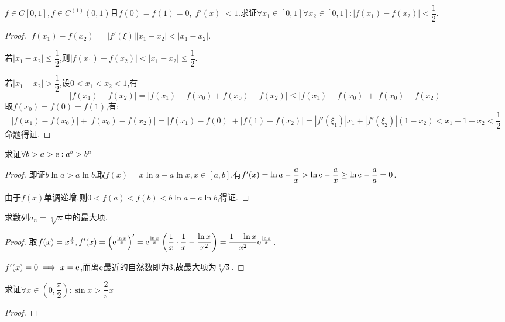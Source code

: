 \documentclass[UTF8]{book}
\begin{document}
    \begin{example}
        $f\in C[0,1],f\in C^{(1)}(0,1)$且$f(0)=f(1)=0, |f'(x)|<1$.求证$\forall x_1\in [0,1]\forall x_2\in [0,1]:|f(x_1)-f(x_2)|<\dfrac{1}{2}$.
    \end{example}\begin{proof}
        $|f(x_1)-f(x_2)|=|f'(\xi)||x_1-x_2|<|x_1-x_2|$.

        若$|x_1-x_2|\leq \dfrac{1}{2}$,则$|f(x_1)-f(x_2)|<|x_1-x_2|\leq \dfrac{1}{2}$.

        若$|x_1-x_2|>\dfrac{1}{2}$,设$0<x_1<x_2<1$,有\[|f(x_1)-f(x_2)|=|f(x_1)-f(x_0)+f(x_0)-f(x_2)|\leq |f(x_1)-f(x_0)|+|f(x_0)-f(x_2)|\]
        取$f(x_0)=f(0)=f(1)$,有:
        \[|f(x_1)-f(x_0)|+|f(x_0)-f(x_2)|=|f(x_1)-f(0)|+|f(1)-f(x_2)|=|f'(\xi_1)|x_1+|f'(\xi_2)|(1-x_2)<x_1+1-x_2<\frac{1}{2}\]命题得证.
    \end{proof}\begin{example}
        求证$\forall b>a>\mathrm{e}: a^b>b^a$
    \end{example}\begin{proof}
        即证$b\ln a>a\ln b$.取$f(x)=x\ln a-a\ln x, x\in [a,b]$,有$f'(x)=\ln a-\dfrac{a}{x}>\ln \mathrm{e}-\dfrac{a}{x}\geq \ln\mathrm{e} -\dfrac{a}{a}=0$.

        由于$f(x)$单调递增,则$0<f(a)<f(b)<b\ln a-a\ln b$,得证.
    \end{proof}\begin{example}
        求数列$a_n=\sqrt[n]{n}$中的最大项.
    \end{example}\begin{proof}
        取$f(x)=x^{\frac{1}{x}},f'(x)=\left( \mathrm{e}^{\frac{\ln x}{x}} \right)'=\mathrm{e}^{\frac{\ln x}{x}}\left( \dfrac{1}{x}\cdot\dfrac{1}{x}-\dfrac{\ln x}{x^2} \right)=\dfrac{1-\ln x}{x^2}\mathrm{e}^{\frac{\ln x}{x}}$.

        $f'(x)=0\implies x=\mathrm{e}$,而离$\mathrm{e}$最近的自然数即为3,故最大项为$\sqrt[3]{3}$.
    \end{proof}\begin{example}
        求证$\forall x\in \left( 0,\dfrac{\pi}{2} \right):\sin x>\dfrac{2}{\pi}x$
    \end{example}\begin{proof}
        

\end{proof}
\end{document}
